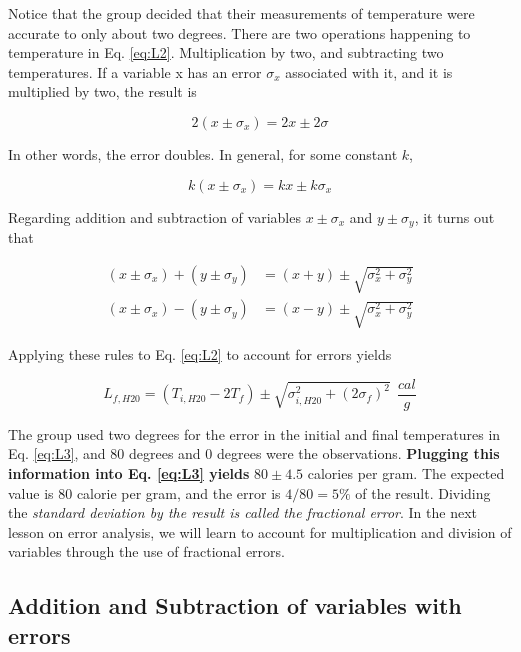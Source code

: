 \documentclass[12pt]{article}
\begin{document}
Notice that the group decided that their measurements of temperature were accurate to only about two degrees.  There are two operations happening to temperature in Eq. \ref{eq:L2}.  Multiplication by two, and subtracting two temperatures.  If a variable x has an error $\sigma_x$ associated with it, and it is multiplied by two, the result is

\begin{equation}
2(x\pm \sigma_x) = 2x \pm 2\sigma
\end{equation}

In other words, the error doubles.  In general, for some constant $k$,

\begin{equation}
k(x\pm \sigma_x) = kx \pm k\sigma_x
\end{equation}

Regarding addition and subtraction of variables $x\pm \sigma_x$ and $y\pm \sigma_y$, it turns out that

\begin{align}
(x\pm \sigma_x) + (y\pm \sigma_y) &= (x+y) \pm \sqrt{\sigma_x^2 + \sigma_y^2} \\
(x\pm \sigma_x) - (y\pm \sigma_y) &= (x-y) \pm \sqrt{\sigma_x^2 + \sigma_y^2}
\end{align}

Applying these rules to Eq. \ref{eq:L2} to account for errors yields

\begin{equation}
L_{f,H20} = \left( T_{i,H20} - 2T_f\right) \pm \sqrt{\sigma_{i,H20}^2 + (2\sigma_f)^2}~~\frac{cal}{g} \label{eq:L3}
\end{equation}

The group used two degrees for the error in the initial and final temperatures in Eq. \ref{eq:L3}, and 80 degrees and 0 degrees were the observations.  \textbf{Plugging this information into Eq. \ref{eq:L3} yields} $80 \pm 4.5$ calories per gram.  The expected value is 80 calorie per gram, and the error is $4/80 = 5\%$ of the result.  Dividing the \textit{standard deviation by the result is called the fractional error}.  In the next lesson on error analysis, we will learn to account for multiplication and division of variables through the use of fractional errors.

\subsection{Addition and Subtraction of variables with errors}
\end{document}
